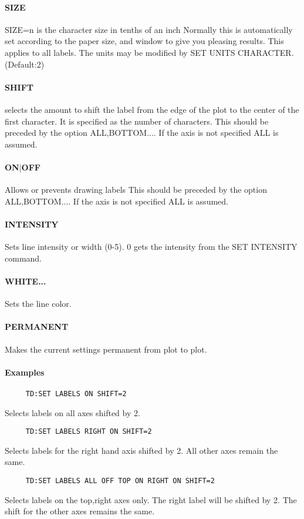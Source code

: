 \paragraph{SIZE}
SIZE=n  is  the  character size in tenths of an inch Normally this is
automatically set according to the paper size, and window to give you
pleasing  results.   This  applies  to  all labels.  The units may be
modified by SET UNITS CHARACTER.  
(Default:2) 
\paragraph{SHIFT}
selects  the  amount  to shift the label from the edge of the plot to
the center of the first character.  It is specified as the number  of
characters.  This should be preceded by the option ALL,BOTTOM....  If
the axis is not specified ALL is assumed.  
\paragraph{ON$|$OFF}
Allows  or  prevents  drawing  labels  This should be preceded by the
option ALL,BOTTOM....  If the axis is not specified ALL is assumed.  
\paragraph{INTENSITY}
Sets  line  intensity  or width (0-5).  0 gets the intensity from the
SET INTENSITY command.  
\paragraph{WHITE...}
Sets the line color.  
\paragraph{PERMANENT}
Makes the current settings permanent from plot to plot.  
\paragraph{Examples}
\begin{verbatim}
     TD:SET LABELS ON SHIFT=2 
\end{verbatim}
Selects labels on all axes shifted by 2.  
\begin{verbatim}
     TD:SET LABELS RIGHT ON SHIFT=2 
\end{verbatim}
Selects  labels for the right hand axis shifted by 2.  All other axes
remain the same.  
\begin{verbatim}
     TD:SET LABELS ALL OFF TOP ON RIGHT ON SHIFT=2 
\end{verbatim}
Selects  labels  on the top,right axes only.  The right label will be
shifted by 2.  The shift for the other axes remains the same.  
